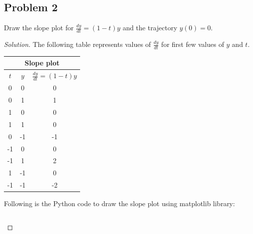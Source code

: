 \documentclass{article}
\newenvironment{solution}
{\renewcommand\qedsymbol{$\blacksquare$}\begin{proof}[Solution]}{\end{proof}}
\begin{document}
\subsection*{Problem 2}
Draw the slope plot for $\frac{dy}{dt} = (1-t)y$ and the trajectory $y(0) = 0$.
\begin{solution}
	The following table represents values of $\frac{dy}{dt}$ for first few values of $y$ and $t$.
	
	\begin{center}
		{
			\begin{tabular}{ |p{3cm}|p{3cm}|p{3cm}| }
				\hline
				\multicolumn{3}{|c|}{Slope plot} \\
				\hline
				\multicolumn{1}{|c|}{$t$} & \multicolumn{1}{c|}{$y$} & \multicolumn{1}{c|}{$\frac{dy}{dt} = (1-t)y $} \\
				\hline
				\multicolumn{1}{|c|}{0} & \multicolumn{1}{c|}{0} & \multicolumn{1}{c|}{0} \\
				\multicolumn{1}{|c|}{0} & \multicolumn{1}{c|}{1} & \multicolumn{1}{c|}{1} \\
				\multicolumn{1}{|c|}{1} & \multicolumn{1}{c|}{0} & \multicolumn{1}{c|}{0} \\
				\multicolumn{1}{|c|}{1} & \multicolumn{1}{c|}{1} & \multicolumn{1}{c|}{0} \\
				\multicolumn{1}{|c|}{0} & \multicolumn{1}{c|}{-1} & \multicolumn{1}{c|}{-1} \\
				\multicolumn{1}{|c|}{-1} & \multicolumn{1}{c|}{0} & \multicolumn{1}{c|}{0} \\
				\multicolumn{1}{|c|}{-1} & \multicolumn{1}{c|}{1} & \multicolumn{1}{c|}{2} \\
				\multicolumn{1}{|c|}{1} & \multicolumn{1}{c|}{-1} & \multicolumn{1}{c|}{0} \\
				\multicolumn{1}{|c|}{-1} & \multicolumn{1}{c|}{-1} & \multicolumn{1}{c|}{-2} \\
				\hline
			\end{tabular}
		}
\newline
\newline
\newline

	\end{center}


Following is the Python code to draw the slope plot using matplotlib library:

\begin{lstlisting}[language=Python, caption=Slope plot code]


\end{lstlisting}
\end{solution}
\end{document}
